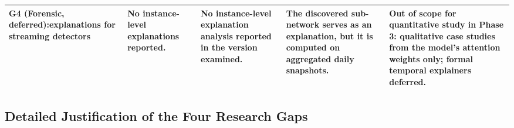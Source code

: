 \documentclass[11pt,a4paper]{article}
\begin{document}
\begin{table}[htbp]
\begin{tabularx}{\textwidth}{L{2.0cm} L{2.75cm} L{2.75cm} L{2.75cm} X}
\midrule
\textbf{G4 (Forensic, deferred):}\newline explanations for streaming detectors & No instance-level explanations reported. & No instance-level explanation analysis reported in the version examined. & The discovered sub-network serves as an explanation, but it is computed on aggregated daily snapshots. & Out of scope for quantitative study in Phase 3: qualitative case studies from the model's attention weights only; formal temporal explainers deferred. \\
\bottomrule
\end{tabularx}
\end{table}

\subsection{Detailed Justification of the Four Research Gaps}
\label{sec:gap_justification}
\end{document}
